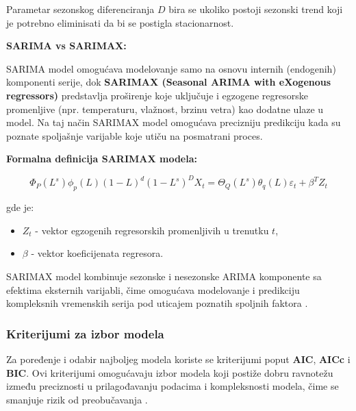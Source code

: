 \documentclass[12pt]{article}
\begin{document}
Parametar sezonskog diferenciranja $D$ bira se ukoliko postoji sezonski trend koji je potrebno eliminisati da bi se postigla stacionarnost.

\textbf{SARIMA vs SARIMAX:}

SARIMA model omogućava modelovanje samo na osnovu internih (endogenih) komponenti serije, dok \textbf{SARIMAX (Seasonal ARIMA with eXogenous regressors)} predstavlja proširenje koje uključuje i egzogene regresorske promenljive (npr. temperaturu, vlažnost, brzinu vetra) kao dodatne ulaze u model. Na taj način SARIMAX model omogućava precizniju predikciju kada su poznate spoljašnje varijable koje utiču na posmatrani proces.

\textbf{Formalna definicija SARIMAX modela:}

\begin{equation}
\Phi_P (L^s) \phi_p (L) (1 - L)^d (1 - L^s)^D X_t
= \Theta_Q (L^s) \theta_q (L) \varepsilon_t + \beta^T Z_t
\end{equation}

gde je:
\begin{itemize}
    \item $Z_t$ - vektor egzogenih regresorskih promenljivih u trenutku $t$,
    \item $\beta$ - vektor koeficijenata regresora.
\end{itemize}

SARIMAX model kombinuje sezonske i nesezonske ARIMA komponente sa efektima eksternih varijabli, čime omogućava modelovanje i predikciju kompleksnih vremenskih serija pod uticajem poznatih spoljnih faktora \cite{box1970, brockwell2002}.


\subsubsection{Kriterijumi za izbor modela}

Za poređenje i odabir najboljeg modela koriste se kriterijumi poput \textbf{AIC}, \textbf{AICc} i \textbf{BIC}. Ovi kriterijumi omogućavaju izbor modela koji postiže dobru ravnotežu između preciznosti u prilagođavanju podacima i kompleksnosti modela, čime se smanjuje rizik od preobučavanja \cite{burnham2002}.
\end{document}
